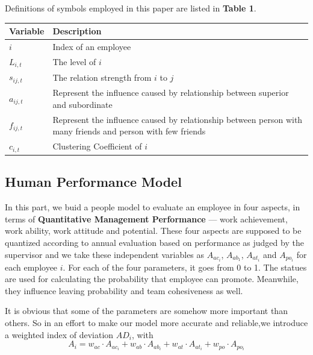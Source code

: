 \documentclass[12pt,a4paper,titlepage]{article}
\begin{document}
Definitions of symbols employed in this paper are listed in
\textbf{Table 1}.
\begin{table}
\begin{tabular}{|l|l|}
  Variable & Description \\
  \hline
  $i$            &Index of an employee \\
  $L_{i,t}$          &The level of $i$ \\
  $s_{ij,t}$        &The relation strength from $i$ to $j$ \\
  $a_{ij,t}$        &Represent the influence caused by relationship
                    between superior and subordinate \\
  $f_{ij,t}$        &Represent the influence caused by relationship
                    between person with many friends and person with
                    few friends \\
  $c_{i,t}$        &Clustering Coefficient of $i$
\end{tabular}
\end{table}

\subsection{Human Performance Model}
\label{sec:human-model}

In this part, we buid a people model to evaluate an employee in four
aspects, in terms of \textbf{Quantitative Management Performance} ---
work achievement, work ability, work attitude and potential. These
four aspects are supposed to be quantized according to annual
evaluation based on performance as judged by the supervisor and we
take these independent variables as $A_{ac_i}$, $A_{ab_1}$, $A_{at_i}$
and $A_{po_i}$ for each employee $i$. For each of the four parameters,
it goes from 0 to 1. The statues are used for calculating the
probability that employee can promote. Meanwhile, they influence
leaving probability and team cohesiveness as well.

It is obvious that some of the parameters are somehow more important
than others. So in an effort to make our model more accurate and
reliable,we introduce a weighted index of deviation $AD_i$, with
\begin{equation}
  A_i=w_{ac} \cdot A_{ac_i} + w_{ab} \cdot A_{ab_i} + w_{at} \cdot A_{at_i} +
  w_{po} \cdot A_{po_i}
\end{equation}
\end{document}
